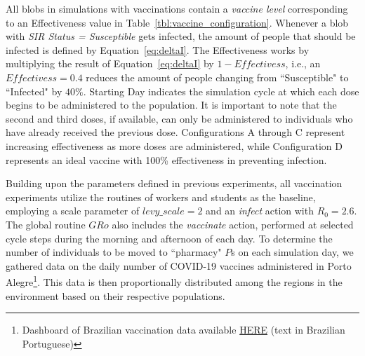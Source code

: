 \documentclass[pdflatex,sn-mathphys-num]{sn-jnl}%
\theoremstyle{thmstyleone}%
\theoremstyle{thmstyletwo}%
\theoremstyle{thmstylethree}%
\begin{document}
All blobs in simulations with vaccinations contain a \textit{vaccine level} corresponding to an Effectiveness value in Table~\ref{tbl:vaccine_configuration}. Whenever a blob with \textit{SIR Status = Susceptible} gets infected, the amount of people that should be infected is defined by Equation~\ref{eq:deltaI}. The Effectiveness works by multiplying the result of Equation~\ref{eq:deltaI} by $1-Effectivess$, i.e., an $Effectivess=0.4$ reduces the amount of people changing from ``Susceptible" to ``Infected" by $40\%$. Starting Day indicates the simulation cycle at which each dose begins to be administered to the population. It is important to note that the second and third doses, if available, can only be administered to individuals who have already received the previous dose. Configurations A through C represent increasing effectiveness as more doses are administered, while Configuration D represents an ideal vaccine with 100\% effectiveness in preventing infection.

Building upon the parameters defined in previous experiments, all vaccination experiments utilize the routines of workers and students as the baseline, employing a scale parameter of $levy\_scale = 2$ and an \textit{infect} action with $R_0 = 2.6$. The global routine $GRo$ also includes the \textit{vaccinate} action, performed at selected cycle steps during the morning and afternoon of each day. To determine the number of individuals to be moved to ``pharmacy" $P$s on each simulation day, we gathered data on the daily number of COVID-19 vaccines administered in Porto Alegre\footnote{Dashboard of Brazilian vaccination data available \href{https://vacina.saude.rs.gov.br/}{HERE} (text in Brazilian Portuguese)}. This data is then proportionally distributed among the regions in the environment based on their respective populations.
\end{document}
